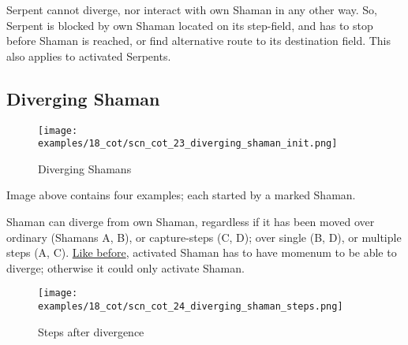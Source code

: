 \vspace*{-0.5\baselineskip}
Serpent cannot diverge, nor interact with own Shaman in any other way. So, Serpent
is blocked by own Shaman located on its step-field, and has to stop before Shaman
is reached, or find alternative route to its destination field. This also applies
to activated Serpents.

\clearpage %

\subsection*{Diverging Shaman}
\label{sec:Conquest of Tlalocan/Shaman/Movement/Diverging Shaman}

\vspace*{-1.4\baselineskip}
\noindent
\begin{figure}[!h]
\texttt{[image: examples/18\_cot/scn\_cot\_23\_diverging\_shaman\_init.png]}
\vspace*{-1.3\baselineskip}
\caption{Diverging Shamans}
\label{fig:scn_cot_23_diverging_shaman_init}
\end{figure}

\vspace*{-0.4\baselineskip}
Image above contains four examples; each started by a marked Shaman.

Shaman can diverge from own Shaman, regardless if it has been moved over ordinary
(Shamans A, B), or capture-steps (C, D); over single (B, D), or multiple steps (A, C).
\hyperref[fig:scn_cot_11_diverging_activated_piece_init]{Like before}, activated
Shaman has to have momenum to be able to diverge; otherwise it could only activate
Shaman.

\clearpage %

\vspace*{-2.1\baselineskip}
\noindent
\begin{figure}[!h]
\texttt{[image: examples/18\_cot/scn\_cot\_24\_diverging\_shaman\_steps.png]}
\vspace*{-1.3\baselineskip}
\caption{Steps after divergence}
\label{fig:scn_cot_24_diverging_shaman_steps}
\end{figure}


